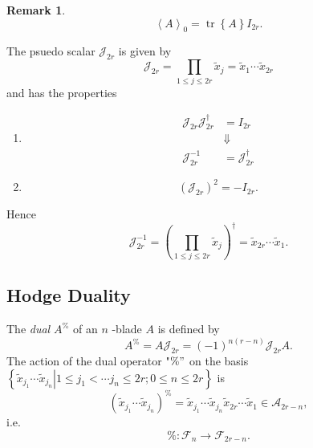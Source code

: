 \documentclass[aps,preprint]{revtex4}%
\newtheorem{remark}[theorem]{Remark}
\begin{document}
\begin{remark}%
\begin{equation}
\left\langle A\right\rangle _{0}=\operatorname*{tr}\left\{  A\right\}  I_{2r}.
\end{equation}

\end{remark}

The psuedo scalar $\mathcal{J}_{2r}$ is given by%
\begin{equation}
\mathcal{J}_{2r}=%
{\textstyle\prod\limits_{1\leq j\leq2r}}
\widetilde{x}_{j}=\widetilde{x}_{1}\cdots\widetilde{x}_{2r}%
\end{equation}
and has the properties

\begin{enumerate}
\item
\begin{align}
\mathcal{J}_{2r}\mathcal{J}_{2r}^{\dagger}  &  =I_{2r}\\
&  \Downarrow\\
\mathcal{J}_{2r}^{-1}  &  =\mathcal{J}_{2r}^{\dagger}%
\end{align}


\item
\begin{equation}
\left(  \mathcal{J}_{2r}\right)  ^{2}=-I_{2r}.
\end{equation}

\end{enumerate}

Hence
\begin{equation}
\mathcal{J}_{2r}^{-1}=\left(
{\textstyle\prod\limits_{1\leq j\leq2r}}
\widetilde{x}_{j}\right)  ^{\dagger}=\widetilde{x}_{2r}\cdots\widetilde{x}%
_{1}.
\end{equation}


\subsection{Hodge Duality}

The \emph{dual} $A^{\%}$ of an $n$ -blade $A$ is defined by
\begin{equation}
A^{\%}=A\mathcal{J}_{2r}=\left(  -1\right)  ^{n\left(  r-n\right)
}\mathcal{J}_{2r}A.
\end{equation}
The action of the dual operator "$\%"$ on the basis $\left\{  \left.
\widetilde{x}_{j_{1}}\cdots\widetilde{x}_{j_{n}}\right\vert 1\leq j_{1}<\cdots
j_{n}\leq2r;0\leq n\leq2r\right\}  $ is
\begin{equation}
\left(  \widetilde{x}_{j_{1}}\cdots\widetilde{x}_{j_{n}}\right)
^{\%}=\widetilde{x}_{j_{1}}\cdots\widetilde{x}_{j_{n}}\widetilde{x}_{2r}%
\cdots\widetilde{x}_{1}\in\mathcal{A}_{2r-n},
\end{equation}
i.e.%
\begin{equation}
\%:\mathcal{F}_{n}\rightarrow\mathcal{F}_{2r-n}.
\end{equation}
\end{document}
